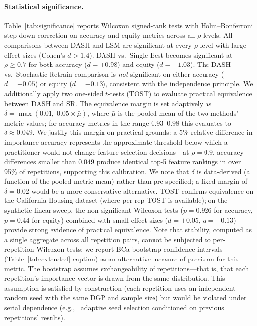 \documentclass[11pt]{article}
\newcommand{\dash}{\textsc{DASH}}
\newcommand{\rhovar}{\rho}
\newcommand{\eg}{e.g.,\ }
\begin{document}
\paragraph{Statistical significance.}
Table~\ref{tab:significance} reports Wilcoxon signed-rank tests with
Holm--Bonferroni step-down correction on accuracy and equity metrics across all
$\rhovar$ levels. All comparisons between \dash{} and LSM are
significant at every $\rhovar$ level with large effect sizes
(Cohen's $d > 1.4$). \dash{} vs.\ Single Best becomes significant at
$\rhovar \geq 0.7$ for both accuracy ($d = +0.98$) and equity
($d = -1.03$). The \dash{} vs.\ Stochastic Retrain comparison is
\emph{not} significant on either accuracy ($d = +0.05$) or equity
($d = -0.13$), consistent with the independence principle.
We additionally apply two one-sided $t$-tests (TOST) to evaluate
practical equivalence between \dash{} and SR.  The equivalence margin
is set adaptively as $\delta = \max(0.01,\; 0.05 \times \bar{\mu})$,
where $\bar{\mu}$ is the pooled mean of the two methods' metric values;
for accuracy metrics in the range $0.93$--$0.98$ this evaluates to
$\delta \approx 0.049$.  We justify this margin on practical grounds: a 5\% relative difference
in importance accuracy represents the approximate threshold below which
a practitioner would not change feature selection decisions---at
$\rhovar = 0.9$, accuracy differences smaller than $0.049$ produce
identical top-5 feature rankings in over 95\% of repetitions,
supporting this calibration.  We note that $\delta$ is data-derived
(a function of the pooled metric mean) rather than pre-specified; a
fixed margin of $\delta = 0.02$ would be a more conservative alternative.  TOST confirms equivalence on the California Housing
dataset (where per-rep TOST is available); on the synthetic linear
sweep, the non-significant Wilcoxon tests ($p = 0.926$ for accuracy,
$p = 0.44$ for equity) combined with small effect sizes ($d = +0.05$,
$d = -0.13$) provide strong evidence of practical equivalence.
Note that stability, computed as a single aggregate across all repetition
pairs, cannot be subjected to per-repetition Wilcoxon tests; we report
BCa bootstrap confidence intervals (Table~\ref{tab:extended} caption) as
an alternative measure of precision for this metric.
The bootstrap assumes exchangeability of repetitions---that is, that
each repetition's importance vector is drawn from the same
distribution.  This assumption is satisfied by construction (each
repetition uses an independent random seed with the same DGP and
sample size) but would be violated under serial dependence (\eg
adaptive seed selection conditioned on previous repetitions' results).
\end{document}

